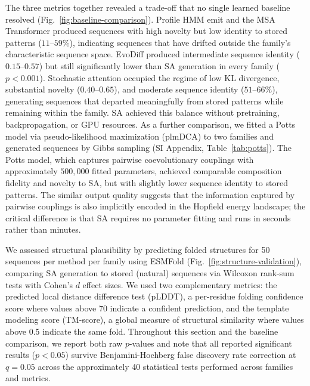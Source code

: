 The three metrics together revealed a trade-off that no single learned baseline resolved (Fig.~\ref{fig:baseline-comparison}). Profile HMM emit and the MSA Transformer produced sequences with high novelty but low identity to stored patterns ($11$--$59\%$), indicating sequences that have drifted outside the family's characteristic sequence space. EvoDiff produced intermediate sequence identity ($0.15$--$0.57$) but still significantly lower than SA generation in every family ($p < 0.001$). Stochastic attention occupied the regime of low KL divergence, substantial novelty ($0.40$--$0.65$), and moderate sequence identity ($51$--$66\%$), generating sequences that departed meaningfully from stored patterns while remaining within the family. SA achieved this balance without pretraining, backpropagation, or GPU resources. As a further comparison, we fitted a Potts model via pseudo-likelihood maximization (plmDCA) to two families and generated sequences by Gibbs sampling (SI Appendix, Table~\ref{tab:potts}). The Potts model, which captures pairwise coevolutionary couplings with approximately $500{,}000$ fitted parameters, achieved comparable composition fidelity and novelty to SA, but with slightly lower sequence identity to stored patterns. The similar output quality suggests that the information captured by pairwise couplings is also implicitly encoded in the Hopfield energy landscape; the critical difference is that SA requires no parameter fitting and runs in seconds rather than minutes.

We assessed structural plausibility by predicting folded structures for 50 sequences per method per family using ESMFold (Fig.~\ref{fig:structure-validation}), comparing SA generation to stored (natural) sequences via Wilcoxon rank-sum tests with Cohen's $d$ effect sizes. We used two complementary metrics: the predicted local distance difference test (pLDDT), a per-residue folding confidence score where values above 70 indicate a confident prediction, and the template modeling score (TM-score), a global measure of structural similarity where values above 0.5 indicate the same fold. Throughout this section and the baseline comparison, we report both raw $p$-values and note that all reported significant results ($p < 0.05$) survive Benjamini-Hochberg false discovery rate correction at $q{=}0.05$ across the approximately 40 statistical tests performed across families and metrics.

